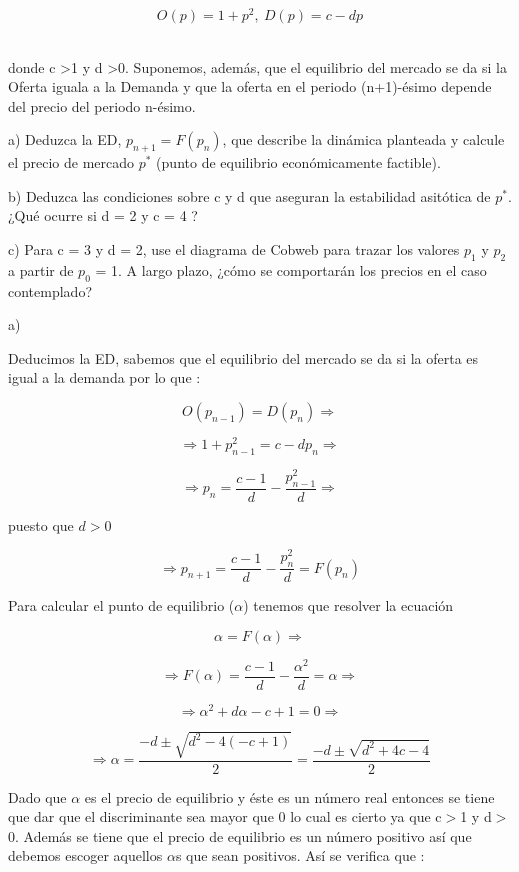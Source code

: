 \documentclass[11pt, a4paper]{article}
\newif\IfInSansMode
\theoremstyle{theorem-style}
\theoremstyle{definition-style}
\theoremstyle{remark-style}
\theoremstyle{example-style}
\begin{document}
    \[ 
        O(p) = 1 + p^{2}, \ D(p) = c - dp
    \]\

    donde c \textgreater 1 y d \textgreater 0. Suponemos, adem\'as, que el equilibrio del mercado se da si la Oferta iguala a la Demanda y que la oferta en el periodo (n+1)-\'esimo depende del precio del periodo n-\'esimo.

    a) Deduzca la ED, $p_{n+1} = F(p_n)$, que describe la din\'amica planteada y calcule el precio de mercado $p^{*}$ (punto de equilibrio econ\'omicamente factible).

    b) Deduzca las condiciones sobre c y d que aseguran la estabilidad asit\'otica de $p^{*}$. ¿Qu\'e ocurre si d = 2 y c = 4 ?

    c) Para c = 3 y d = 2, use el diagrama de Cobweb para trazar los valores $p_1$ y $p_2$ a partir de $p_0$ = 1. A largo plazo, ¿c\'omo se comportar\'an los precios en el caso contemplado?

    a)

    Deducimos la ED, sabemos que el equilibrio del mercado se da si la oferta es igual a la demanda por lo que :

    \[
        O(p_{n-1}) = D (p_n) \Rightarrow
    \]

    \[ 
        \Rightarrow 1 + p_{n-1}^{2} = c - dp_n \Rightarrow 
    \]

    \[ 
        \Rightarrow p_n = \frac{c-1}{d} - \frac{p_{n-1}^{2}}{d} \Rightarrow 
    \]

    puesto que $d>0$

    \[
        \Rightarrow p_{n+1} = \frac{c-1}{d} - \frac{p_{n}^{2}}{d} = F(p_n)
    \]

    Para calcular el punto de equilibrio ($\alpha$) tenemos que resolver la ecuaci\'on 

    \[
        \alpha = F(\alpha) \Rightarrow
    \]

    \[
        \Rightarrow F(\alpha) = \frac{c-1}{d} - \frac{\alpha^{2}}{d} = \alpha \Rightarrow
    \]

    \[
        \Rightarrow \alpha^{2} + d\alpha -c+1 = 0 \Rightarrow
    \]

    \[
        \Rightarrow \alpha = \frac{-d\pm\sqrt{d^{2} - 4(-c+1)}}{2} = \frac{-d\pm\sqrt{d^{2} +4c-4}}{2}
    \]

    Dado que $\alpha$ es el precio de equilibrio y \'este es un n\'umero real entonces se tiene que dar que el discriminante sea mayor que 0 lo cual es cierto ya que c$>$1 y d$>$0. Adem\'as se tiene que el precio de equilibrio es un n\'umero positivo así que debemos escoger aquellos $\alpha$s que sean positivos. As\'i se verifica que :
\end{document}
